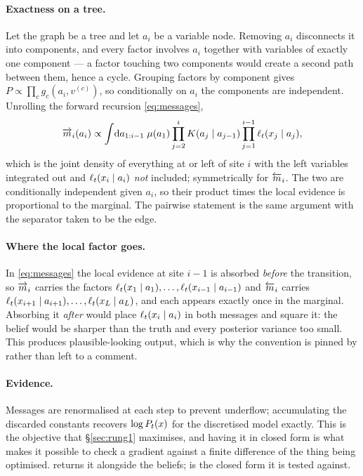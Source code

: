 \paragraph{Exactness on a tree.} Let the graph be a tree and let $a_i$ be a variable node.
Removing $a_i$ disconnects it into components, and every factor involves $a_i$ together with
variables of exactly one component --- a factor touching two components would create a second
path between them, hence a cycle. Grouping factors by component gives
$P \propto \prod_c g_c(a_i, v^{(c)})$, so conditionally on $a_i$ the components are independent.
Unrolling the forward recursion \eqref{eq:messages},
\[
\overrightarrow{m}_i(a_i) \propto \int\!\mathrm{d}a_{1:i-1}\;
\mu(a_1)\prod_{j=2}^{i}K(a_j\mid a_{j-1})\prod_{j=1}^{i-1}\ell_t(x_j\mid a_j),
\]
which is the joint density of everything at or left of site $i$ with the left variables
integrated out and $\ell_t(x_i\mid a_i)$ \emph{not} included; symmetrically for $\overleftarrow{m}_i$. The two
are conditionally independent given $a_i$, so their product times the local evidence is
proportional to the marginal. The pairwise statement is the same argument with the separator
taken to be the edge.

\paragraph{Where the local factor goes.} In \eqref{eq:messages} the local evidence at site $i-1$
is absorbed \emph{before} the transition, so $\overrightarrow{m}_i$ carries the factors
$\ell_t(x_1\mid a_1),\dots,\ell_t(x_{i-1}\mid a_{i-1})$ and $\overleftarrow{m}_i$ carries
$\ell_t(x_{i+1}\mid a_{i+1}),\dots,\ell_t(x_{L}\mid a_{L})$, and each appears exactly
once in the marginal. Absorbing it \emph{after} would place $\ell_t(x_i\mid a_i)$ in both
messages and square it: the
belief would be sharper than the truth and every posterior variance too small. This produces
plausible-looking output, which is why the convention is pinned by
 rather than left to a comment.

\paragraph{Evidence.} Messages are renormalised at each step to prevent underflow; accumulating
the discarded constants recovers $\log P_t(x)$ for the discretised model exactly. This is the
objective that \S\ref{sec:rung1} maximises, and having it in closed form is what makes it possible
to check a gradient against a finite difference of the thing being optimised.
 returns it alongside the beliefs;
 is the closed form it is tested against.

